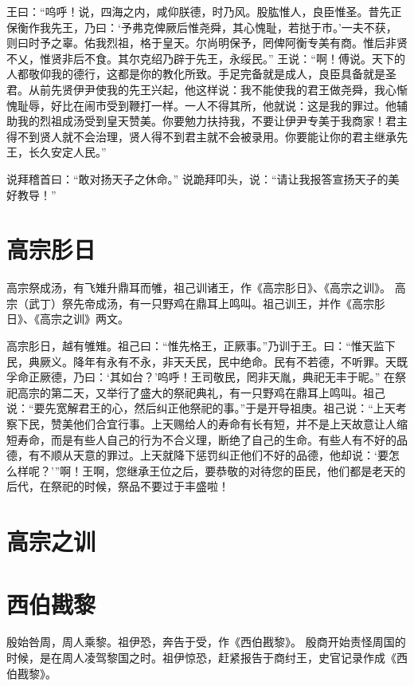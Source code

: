\documentclass[a4paper,12pt,UTF8,twoside]{ctexbook}
\begin{document}
王曰：“呜呼！说，四海之内，咸仰朕德，时乃风。股肱惟人，良臣惟圣。昔先正保衡作我先王，乃曰：‘予弗克俾厥后惟尧舜，其心愧耻，若挞于市。’一夫不获，则曰时予之辜。佑我烈祖，格于皇天。尔尚明保予，罔俾阿衡专美有商。惟后非贤不乂，惟贤非后不食。其尔克绍乃辟于先王，永绥民。”
王说：“啊！傅说。天下的人都敬仰我的德行，这都是你的教化所致。手足完备就是成人，良臣具备就是圣君。从前先贤伊尹使我的先王兴起，他这样说：我不能使我的君王做尧舜，我心惭愧耻辱，好比在闹市受到鞭打一样。一人不得其所，他就说：这是我的罪过。他辅助我的烈祖成汤受到皇天赞美。你要勉力扶持我，不要让伊尹专美于我商家！君主得不到贤人就不会治理，贤人得不到君主就不会被录用。你要能让你的君主继承先王，长久安定人民。”

说拜稽首曰：“敢对扬天子之休命。”
说跪拜叩头，说：“请让我报答宣扬天子的美好教导！”\\

\chapter{高宗肜日}

高宗祭成汤，有飞雉升鼎耳而雊，祖己训诸王，作《高宗肜日》、《高宗之训》。
高宗（武丁）祭先帝成汤，有一只野鸡在鼎耳上鸣叫。祖己训王，并作《高宗肜日》、《高宗之训》两文。

高宗肜日，越有雊雉。祖己曰：“惟先格王，正厥事。”乃训于王。曰：“惟天监下民，典厥义。降年有永有不永，非天夭民，民中绝命。民有不若德，不听罪。天既孚命正厥德，乃曰：‘其如台？’呜呼！王司敬民，罔非天胤，典祀无丰于昵。”
在祭祀高宗的第二天，又举行了盛大的祭祀典礼，有一只野鸡在鼎耳上鸣叫。祖己说：“要先宽解君王的心，然后纠正他祭祀的事。”于是开导祖庚。祖己说：“上天考察下民，赞美他们合宜行事。上天赐给人的寿命有长有短，并不是上天故意让人缩短寿命，而是有些人自己的行为不合义理，断绝了自己的生命。有些人有不好的品德，有不顺从天意的罪过。上天就降下惩罚纠正他们不好的品德，他却说：‘要怎么样呢？’”啊！王啊，您继承王位之后，要恭敬的对待您的臣民，他们都是老天的后代，在祭祀的时候，祭品不要过于丰盛啦！

\chapter{高宗之训}
\chapter{西伯戡黎}

殷始咎周，周人乘黎。祖伊恐，奔告于受，作《西伯戡黎》。
殷商开始责怪周国的时候，是在周人凌驾黎国之时。祖伊惊恐，赶紧报告于商纣王，史官记录作成《西伯戡黎》。
\end{document}
